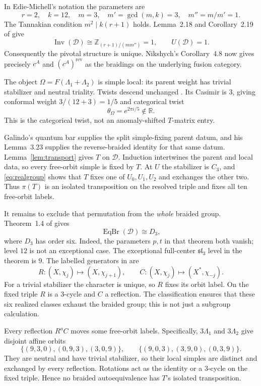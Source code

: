 \documentclass[11pt]{amsart}
\theoremstyle{remark}
\newcommand{\R}{\mathbb R}
\newcommand{\Z}{\mathbb Z}
\newcommand{\D}{\mathcal D}
\newcommand{\Inv}{\operatorname{Inv}}
\newcommand{\rev}{\mathrm{rev}}
\newcommand{\slthree}{\mathfrak{sl}_3}
\begin{document}
In Edie-Michell's notation the parameters are
\[
 r=2,\quad k=12,\quad m=3,\quad
 m'=\gcd(m,k)=3,\quad m''=m/m'=1.
\]
The Tannakian condition $m^2\mid k(r+1)$ holds. Lemma~2.18 and
Corollary~2.19 of \cite{Edie} give
\[
 \Inv(\D)\cong\Z_{(r+1)/(mm'')}=1,
 \qquad U(\D)=1.
\]
Consequently the pivotal structure is unique. Nikshych's
Corollary~4.8 now gives precisely $c^A$ and $(c^A)^{\rev}$ as the
braidings on the underlying fusion category.

The object $\Omega=F(\Lambda_1+\Lambda_2)$ is simple local: its parent
weight has trivial stabilizer and neutral triality. Twists descend
unchanged \cite[Section~2.2]{Edie}. Its Casimir is $3$, giving conformal
weight $3/(12+3)=1/5$ and categorical twist
\[
 \theta_\Omega=e^{2\pi i/5}\notin\R.
\]
This is the categorical twist, not an anomaly-shifted $T$-matrix entry.

Galindo's quantum bar supplies the split simple-fixing parent datum,
and his Lemma~3.23 supplies the reverse-braided identity for that same
datum. Lemma~\ref{lem:transport} gives $T$ on $\D$. Induction
intertwines the parent and local data, so every free-orbit simple is
fixed by $T$. At $U$ the stabilizer is $C_3$, and
\eqref{eq:realgroup} shows that $T$ fixes one of $U_0,U_1,U_2$ and
exchanges the other two. Thus $\pi(T)$ is an isolated transposition on
the resolved triple and fixes all ten free-orbit labels.

It remains to exclude that permutation from the \emph{whole} braided
group. Theorem~1.4 of \cite{Edie} gives
\[
 \operatorname{EqBr}(\D)\cong D_3,
\]
where $D_3$ has order six. Indeed, the parameters $p,t$ in that theorem
both vanish; level $12$ is not an exceptional case. The exceptional
full-center $\slthree$ level in the theorem is $9$. The labelled
generators in \cite[Lemmas~3.8--3.9]{Edie} are
\begin{equation}\label{eq:dihedral}
 R:(X,\chi_j)\longmapsto(X,\chi_{j+1}),\qquad
 C:(X,\chi_j)\longmapsto(X^*,\chi_{-j}).
\end{equation}
For a trivial stabilizer the character is unique, so $R$ fixes its
orbit label. On the fixed triple $R$ is a $3$-cycle and $C$ a reflection.
The classification ensures that these six realized classes exhaust the
braided group; this is not just a subgroup calculation.

Every reflection $R^aC$ moves some free-orbit labels. Specifically,
$3\Lambda_1$ and $3\Lambda_2$ give disjoint affine orbits
\[
 \{(9,3,0),(0,9,3),(3,0,9)\},\qquad
 \{(9,0,3),(3,9,0),(0,3,9)\}.
\]
They are neutral and have trivial stabilizer, so their local simples
are distinct and exchanged by every reflection. Rotations act as the
identity or a $3$-cycle on the fixed triple. Hence no braided
autoequivalence has $T$'s isolated transposition.
\end{document}
